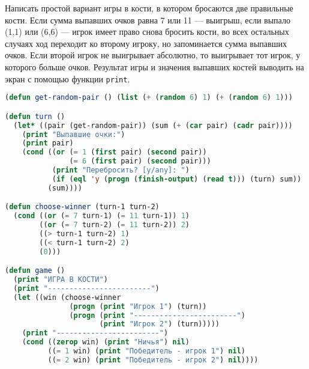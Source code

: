 Написать простой вариант игры в кости, в котором бросаются две
правильные кости. Если сумма выпавших очков равна 7 или 11 —
выигрыш, если выпало (1,1) или (6,6) --- игрок имеет право снова
бросить кости, во всех остальных случаях ход переходит ко второму
игроку, но запоминается сумма выпавших очков. Если второй игрок не
выигрывает абсолютно, то выигрывает тот игрок, у которого больше
очков. Результат игры и значения выпавших костей выводить на экран с
помощью функции \verb|print|.

\begin{lstlisting}[language=Lisp]
(defun get-random-pair () (list (+ (random 6) 1) (+ (random 6) 1)))

(defun turn ()
  (let* ((pair (get-random-pair)) (sum (+ (car pair) (cadr pair))))
    (print "Выпавшие очки:")
    (print pair)
    (cond ((or (= 1 (first pair) (second pair))
               (= 6 (first pair) (second pair)))
           (print "Перебросить? [y/any]: ")
           (if (eql 'y (progn (finish-output) (read t))) (turn) sum))
          (sum))))

(defun choose-winner (turn-1 turn-2)
  (cond ((or (= 7 turn-1) (= 11 turn-1)) 1)
        ((or (= 7 turn-2) (= 11 turn-2)) 2)
        ((> turn-1 turn-2) 1)
        ((< turn-1 turn-2) 2)
        (0)))

(defun game ()
  (print "ИГРА В КОСТИ")
  (print "------------------------")
  (let ((win (choose-winner
               (progn (print "Игрок 1") (turn))
               (progn (print "------------------------")
                      (print "Игрок 2") (turn)))))
    (print "------------------------")
    (cond ((zerop win) (print "Ничья") nil)
          ((= 1 win) (print "Победитель - игрок 1") nil)
          ((= 2 win) (print "Победитель - игрок 2") nil))))
\end{lstlisting}

